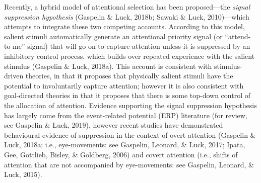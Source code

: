 \documentclass[man, a4paper, noextraspace, 11pt,floatsintext]{apa6}
\begin{document}
Recently, a hybrid model of attentional selection has been
proposed---the \emph{signal suppression hypothesis} (Gaspelin \& Luck,
2018b; Sawaki \& Luck, 2010)---which attempts to integrate these two
competing accounts. According to this model, salient stimuli
automatically generate an attentional priority signal (or
\enquote{attend-to-me} signal) that will go on to capture attention
unless it is suppressed by an inhibitory control process, which builds
over repeated experience with the salient stimulus (Gaspelin \& Luck,
2018a). This account is consistent with stimulus-driven theories, in
that it proposes that physically salient stimuli have the potential to
involuntarily capture attention; however it is also consistent with
goal-directed theories in that it proposes that there is some top-down
control of the allocation of attention. Evidence supporting the signal
suppression hypothesis has largely come from the event-related potential
(ERP) literature (for review, see Gaspelin \& Luck, 2019), however
recent studies have demonstrated behavioural evidence of suppression in
the context of overt attention (Gaspelin \& Luck, 2018a; i.e.,
eye-movements: see Gaspelin, Leonard, \& Luck, 2017; Ipata, Gee,
Gottlieb, Bisley, \& Goldberg, 2006) and covert attention (i.e., shifts
of attention that are not accompanied by eye-movements: see Gaspelin,
Leonard, \& Luck, 2015).
\end{document}
